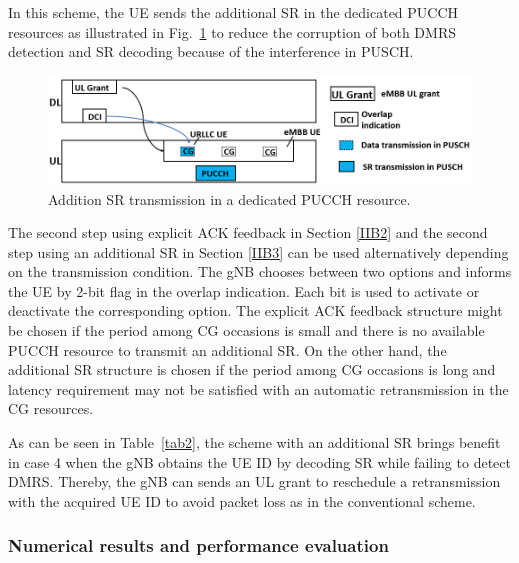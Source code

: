 \documentclass{ieeeaccess}
\begin{document}
In this scheme, the UE sends the additional SR in the dedicated PUCCH resources as illustrated in Fig.~\ref{fig3} to reduce the corruption of both DMRS detection and SR decoding because of the interference in PUSCH.

\begin{figure}[htbp]
\centerline{\includegraphics[scale=0.33]{fig3.PNG}}
\caption{Addition SR transmission in a dedicated PUCCH resource.}
\label{fig3}
\vspace{-2mm}
\end{figure}


The second step using explicit ACK feedback in Section \ref{IIB2} and the second step using an additional SR in Section \ref{IIB3} can be used alternatively depending on the transmission condition. The gNB chooses between two options and informs the UE by 2-bit flag in the overlap indication. Each bit is used to activate or deactivate the corresponding option. The explicit ACK feedback structure might be chosen if the period among CG occasions is small and there is no available PUCCH resource to transmit an additional SR. On the other hand, the additional SR structure is chosen if the period among CG occasions is long and latency requirement may not be satisfied with an automatic retransmission in the CG resources. 

As can be seen in Table~\ref{tab2}, the scheme with an additional SR brings benefit in case 4 when the gNB obtains the UE ID by decoding SR while failing to detect DMRS. Thereby, the gNB can sends an UL grant to reschedule a retransmission with the acquired UE ID to avoid packet loss as in the conventional scheme.  

\subsubsection{Numerical results and performance evaluation}
\end{document}
